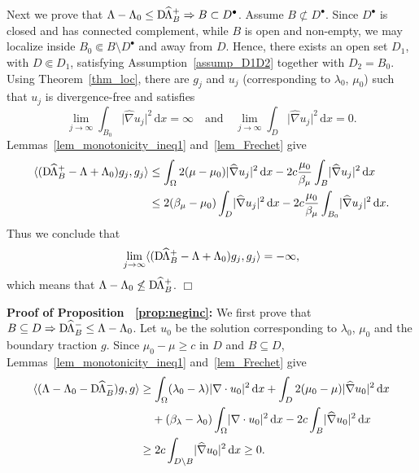 \documentclass[reqno]{amsart}
\numberwithin{equation}{section}
\numberwithin{figure}{section}
\numberwithin{table}{section}
\newcommand{\abs}[1]{\lvert#1\rvert}
\newcommand{\inner}[1]{\langle#1\rangle}
\newcommand{\di}{\mathrm{d}}
\newcommand{\DhLambda}{\textup{D}\mkern-1.5mu \widehat{\Lambda}}
\theoremstyle{definition}
\theoremstyle{plain}
\theoremstyle{definition}
\theoremstyle{remark}
\numberwithin{equation}{section}
\begin{document}
Next we prove that $\Lambda-\Lambda_0 \leq \DhLambda^+_B \Rightarrow B\subset D^\bullet$. Assume $B\not\subset D^\bullet$. Since $D^\bullet$ is closed and has connected complement, while $B$ is open and non-empty, we may localize inside $B_0 \Subset B \setminus D^\bullet$ and away from $D$. Hence, there exists an open set $D_1$, with $D\Subset D_1$, satisfying Assumption~\ref{assump_D1D2} together with $D_2 = B_0$. Using Theorem~\ref{thm_loc}, there are $g_j$ and $u_j$ (corresponding to $\lambda_0$, $\mu_0$) such that $u_j$ is divergence-free and satisfies 
%
\begin{equation*}
	\lim_{j\to\infty}\int_{B_0} \abs{\widehat{\nabla}u_j}^2\,\di x = \infty \quad \text{and}\quad \lim_{j\to\infty}\int_{D} \abs{\widehat{\nabla}u_j}^2\,\di x = 0.
\end{equation*}
%
Lemmas~\ref{lem_monotonicity_ineq1} and~\ref{lem_Frechet} give
%
\begin{align*}
	\inner{(\DhLambda_B^+-\Lambda+\Lambda_0)g_j,g_j} &\leq \int_{\Omega} 2(\mu - \mu_0)\abs{\widehat{\nabla}u_j}^2\,\di x - 2c\frac{\mu_0}{\beta_\mu}\int_B\abs{\widehat{\nabla}u_j}^2\,\di x \\
	&\leq 2(\beta_\mu - \mu_0)\int_{D}\abs{\widehat{\nabla}u_j}^2\,\di x - 2c\frac{\mu_0}{\beta_\mu}\int_{B_0}\abs{\widehat{\nabla}u_j}^2\,\di x.
\end{align*}
%
Thus we conclude that
%
\begin{equation*}
	\lim_{j\to\infty}\inner{(\DhLambda_B^+-\Lambda+\Lambda_0)g_j,g_j} = -\infty,
\end{equation*}
%
which means that $\Lambda-\Lambda_0 \not\leq \DhLambda_B^+$.
\hfill $\Box$


\bigskip
\textbf{Proof of Proposition ~\ref{prop:neginc}:}
We first prove that $B\subseteq D \Rightarrow \DhLambda^-_B \leq \Lambda - \Lambda_0$. Let $u_0$ be the solution corresponding to $\lambda_0$, $\mu_0$ and the boundary traction $g$. Since $\mu_0-\mu \geq c$ in $D$ and $B\subseteq D$, Lemmas~\ref{lem_monotonicity_ineq1} and~\ref{lem_Frechet} give 
%
\begin{align*}
	\inner{(\Lambda-\Lambda_0-\DhLambda_B^-)g,g} &\geq \int_{\Omega} (\lambda_0 - \lambda)\abs{\nabla\cdot u_0}^2\,\di x + \int_D 2(\mu_0 - \mu)\abs{\widehat{\nabla}u_0}^2\,\di x \\
	&\hphantom{\geq{}} + (\beta_\lambda-\lambda_0)\int_\Omega \abs{\nabla\cdot u_0}^2\,\di x - 2c\int_B\abs{\widehat{\nabla}u_0}^2\,\di x \\
	&\geq 2c\int_{D\setminus B} \abs{\widehat{\nabla}u_0}^2\,\di x \geq 0.
\end{align*}
\end{document}
